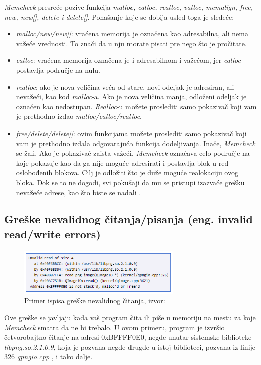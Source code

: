 \documentclass[12pt,oneside]{memoir}
\theoremstyle{plain}
\theoremstyle{definition}
\begin{document}
\textit{Memcheck} presreće pozive funkcija \textit{malloc, calloc, realloc, valloc, memalign, free, new, new[], delete i delete[]}. Ponašanje koje  se dobija usled toga je sledeće:
\begin{itemize}
\item \textit{malloc/new/new[]}: vraćena memorija je označena kao adresabilna, ali nema važeće vrednosti. To znači da u nju morate pisati pre nego što je pročitate.
\item \textit{calloc}: vraćena memorija označena je i adresabilnom i važećom, jer \textit{calloc} postavlja područje na nulu.
\item \textit{realloc}: ako je nova veličina veća od stare, novi odeljak je adresiran, ali nevažeći, kao kod \textit{malloc}-a. Ako je nova veličina manja, odloženi odeljak je označen kao nedostupan. \textit{Realloc}-u možete proslediti samo pokazivač koji vam je prethodno izdao \textit{malloc/calloc/realloc}.
\item \textit{free/delete/delete[]}: ovim funkcijama možete proslediti samo pokazivač koji vam je prethodno izdala odgovarajuća funkcija dodeljivanja. Inače, \textit{Memcheck} se žali. Ako je pokazivač zaista važeći, \textit{Memcheck} označava celo područje na koje pokazuje kao da ga nije moguće adresirati i postavlja blok u red oslobođenih blokova. Cilj je odložiti što je duže moguće realokaciju ovog bloka. Dok se to ne dogodi, svi pokušaji da mu se pristupi izazvaće grešku nevažeće adrese, kao što biste se nadali \cite{Memcheck}. 
\end{itemize}

\subsection{Greške nevalidnog čitanja/pisanja (eng. invalid read/write errors)}
\begin{figure}[!ht]
  \centering
  \includegraphics[width=0.7\textwidth]{invalidReadError.png}
  \caption{Primer ispisa greške nevalidnog čitanja, izvor: \cite{Memcheck}}
  \label{fig:slika2.3}
\end{figure}

Ove greške se javljaju kada vaš program čita ili piše u memoriju na mestu za koje \textit{Memcheck} smatra da ne bi trebalo. U ovom primeru, program je izvršio četvorobajtno čitanje na adresi 0xBFFFF0E0, negde unutar sistemske biblioteke \textit{libpng.so.2.1.0.9}, koja je pozvana negde drugde u istoj biblioteci, pozvana iz linije 326 \textit{qpngio.cpp} , i tako dalje.
\end{document}
